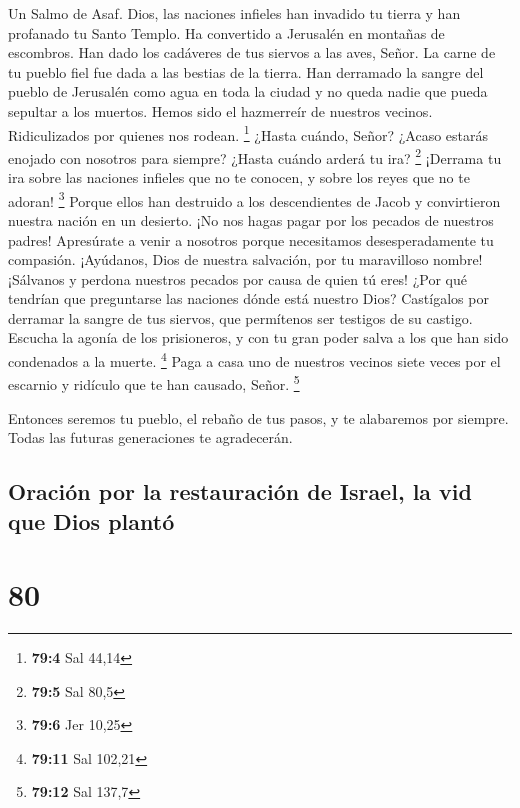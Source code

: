 Un Salmo de Asaf.  Dios, las naciones infieles han invadido
tu tierra y han profanado tu Santo Templo. Ha convertido a Jerusalén en
montañas de escombros.  Han dado los cadáveres de tus
siervos a las aves, Señor. La carne de tu pueblo fiel fue dada a las
bestias de la tierra.  Han derramado la sangre del pueblo de
Jerusalén como agua en toda la ciudad y no queda nadie que pueda
sepultar a los muertos.  Hemos sido el hazmerreír de
nuestros vecinos. Ridiculizados por quienes nos rodean. \footnote{\textbf{79:4}
  Sal 44,14}  ¿Hasta cuándo, Señor? ¿Acaso estarás enojado
con nosotros para siempre? ¿Hasta cuándo arderá tu ira? \footnote{\textbf{79:5}
  Sal 80,5}  ¡Derrama tu ira sobre las naciones infieles que
no te conocen, y sobre los reyes que no te adoran! \footnote{\textbf{79:6}
  Jer 10,25}  Porque ellos han destruido a los descendientes
de Jacob y convirtieron nuestra nación en un desierto.  ¡No
nos hagas pagar por los pecados de nuestros padres! Apresúrate a venir a
nosotros porque necesitamos desesperadamente tu compasión. 
¡Ayúdanos, Dios de nuestra salvación, por tu maravilloso nombre!
¡Sálvanos y perdona nuestros pecados por causa de quien tú eres!
 ¿Por qué tendrían que preguntarse las naciones dónde está
nuestro Dios? Castígalos por derramar la sangre de tus siervos, que
permítenos ser testigos de su castigo.  Escucha la agonía
de los prisioneros, y con tu gran poder salva a los que han sido
condenados a la muerte. \footnote{\textbf{79:11} Sal 102,21}
 Paga a casa uno de nuestros vecinos siete veces por el
escarnio y ridículo que te han causado, Señor. \footnote{\textbf{79:12}
  Sal 137,7}

 Entonces seremos tu pueblo, el rebaño de tus pasos, y te
alabaremos por siempre. Todas las futuras generaciones te agradecerán.

\hypertarget{oraciuxf3n-por-la-restauraciuxf3n-de-israel-la-vid-que-dios-plantuxf3}{%
\subsection{Oración por la restauración de Israel, la vid que Dios
plantó}\label{oraciuxf3n-por-la-restauraciuxf3n-de-israel-la-vid-que-dios-plantuxf3}}

\hypertarget{section-79}{%
\section{80}\label{section-79}}

